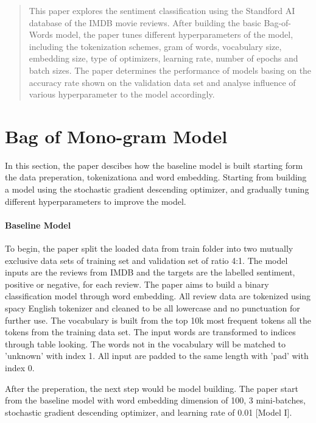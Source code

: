 \documentclass[10pt]{article}
\begin{document}
\maketitle

\begin{abstract}
This paper explores the sentiment classification using the Standford AI database of the IMDB movie reviews. After building the basic Bag-of-Words model, the paper tunes different hyperparameters of the model, including the tokenization schemes, gram of words, vocabulary size, embedding size, type of optimizers, learning rate, number of epochs and batch sizes. The paper determines the performance of models basing on the accuracy rate shown on the validation data set and analyse influence of various hyperparameter to the model accordingly.
\end{abstract}

\section{Bag of Mono-gram Model}
In this section, the paper descibes how the baseline model is built starting form the data preperation, tokenizationa and word embedding.  Starting from building a model using the stochastic gradient descending optimizer, and gradually tuning different hyperparameters to improve the model.

\paragraph{Baseline Model}
To begin, the paper split the loaded data from train folder into two mutually exclusive data sets of training set and validation set of ratio 4:1. The model inputs are the reviews from IMDB and the targets are the labelled sentiment, positive or negative, for each review.  The paper aims to build a binary classification model through word embedding. All review data are tokenized using spacy English tokenizer and cleaned to be all lowercase and no punctuation for further use. The vocabulary is built from the top 10k most frequent tokens all the tokens from the training data set. The input words are transformed to indices through table looking. The words not in the vocabulary will be matched to 'unknown' with index 1.  All input are padded to the same length with 'pad' with index 0.\par
After the preperation, the next step would be model building. The paper start from the baseline model with word embedding dimension of 100, 3 mini-batches, stochastic gradient descending optimizer, and learning rate of 0.01 [Model I].
\end{document}
